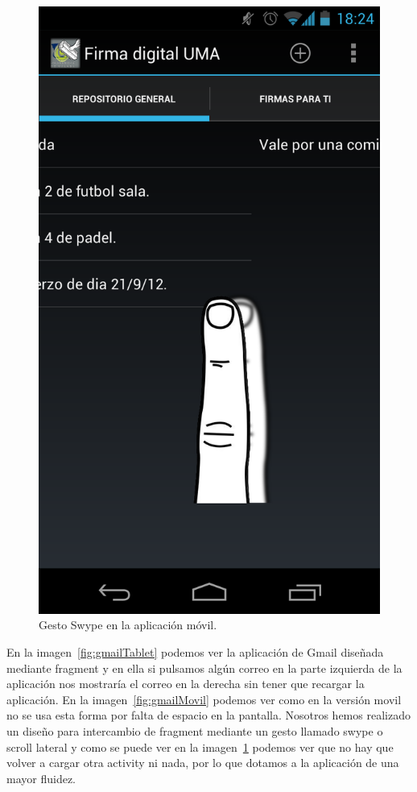 \begin{itemize}
\begin{figure}[h]
  \centering
    \includegraphics[scale=0.2]{./Android/imagenes/swype.png}
  \caption{Gesto Swype en la aplicación móvil.}
  \label{fig:swype}
\end{figure}

En la imagen~\ref{fig:gmailTablet} podemos ver la aplicación de Gmail diseñada mediante fragment y en ella si pulsamos algún correo en la parte izquierda de la aplicación nos mostraría el correo en la derecha sin tener que recargar la aplicación. En la imagen~\ref{fig:gmailMovil} podemos ver como en la versión movil no se usa esta forma por falta de espacio en la pantalla. Nosotros hemos realizado un diseño para intercambio de fragment mediante un gesto llamado swype o scroll lateral y como se puede ver en la imagen~\ref{fig:swype} podemos ver que no hay que volver a cargar otra activity ni nada, por lo que dotamos a la aplicación de una mayor fluidez.


\end{itemize}

